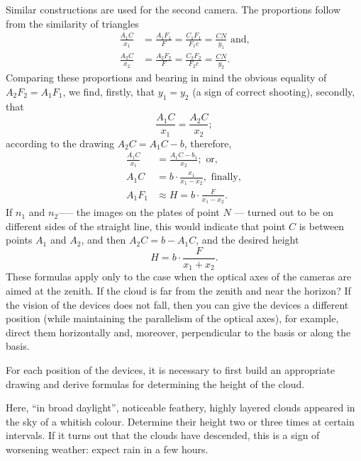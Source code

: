 Similar constructions are used for the second camera. The proportions follow from the similarity of triangles
\begin{align*}%
\frac{A_{1}C}{x_{1}} & = \frac{A_{1}F_{1}}{F} = \frac{C_{1}F_{1}}{F_{1}c} = \frac{CN}{y_{1}} \,\, \text{and,}\\
\frac{A_{2}C}{x_{2}} & = \frac{A_{2}F_{2}}{F} = \frac{C_{2}F_{2}}{F_{2}c} = \frac{CN}{y_{2}}.
\end{align*}
Comparing these proportions and bearing in mind the obvious equality of $A_{2}F_{2} = A_{1}F_{1}$, we find, firstly, that $y_{1} = y_{2}$ (a sign of correct shooting), secondly, that
\begin{equation*}%
\frac{A_{1}C}{x_{1}} = \frac{A_{2}C}{x_{2}};
\end{equation*}	
according to the drawing $A_{2}C = A_{1}C - b$, therefore,
\begin{align*}%
\frac{A_{1}C}{x_{1}} & = \frac{A_{1}C - b_{1}}{x_{2}}; \,\,\text{or,} \\
A_{1}C & = b \cdot \frac{x_{1}}{x_{1} - x_{2}}, \,\, \text{finally},\\
A_{1}F_{1} & \approx  H = b \cdot \frac{F}{x_{1} - x_{2}}.
\end{align*}	
If $n_{1}$ and $n_{2}$--— the images on the plates of point $N$ — turned out to be on different sides of the straight line, this would indicate that point $C$ is between points $A_{1}$ and $A_{2}$, and then $A_{2}C = b - A_{1}C$, and the desired height
\begin{equation*}%
 H = b \cdot \frac{F}{x_{1} + x_{2}}.
\end{equation*}
These formulas apply only to the case when the optical axes of the cameras are aimed at the zenith. If the cloud is far from the zenith and near the horizon? If the vision of the devices does not fall, then you can give the devices a different position (while maintaining the parallelism of the optical axes), for example, direct them horizontally and, moreover, perpendicular to the basis or along the basis. 

For each position of the devices, it is necessary to first build an appropriate drawing and derive formulas for determining the height of the cloud.

\ques Here, ``in broad daylight'', noticeable feathery, highly layered clouds appeared in the sky of a whitish colour. Determine their height two or three times at certain intervals. If it turns out that the clouds have descended, this is a sign of worsening weather: expect rain in a few hours.

